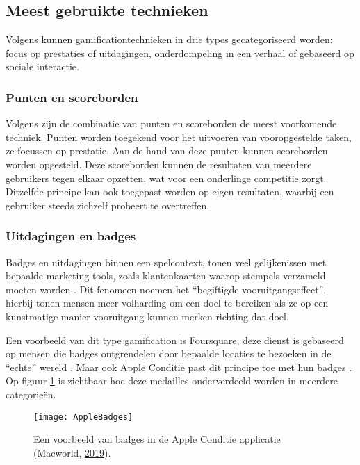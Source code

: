 \subsection{Meest gebruikte technieken}
Volgens \textcite{Legaki2020} kunnen gamificationtechnieken in drie types gecategoriseerd worden: focus op prestaties of uitdagingen, onderdompeling in een verhaal of gebaseerd op sociale interactie.

\subsubsection{Punten en scoreborden}
Volgens \textcite{Hamari2014} zijn de combinatie van punten en scoreborden de meest voorkomende techniek. Punten worden toegekend voor het uitvoeren van vooropgestelde taken, ze focussen op prestatie. Aan de hand van deze punten kunnen scoreborden worden opgesteld. Deze scoreborden kunnen de resultaten van meerdere gebruikers tegen elkaar opzetten, wat voor een onderlinge competitie zorgt. Ditzelfde principe kan ook toegepast worden op eigen resultaten, waarbij een gebruiker steeds zichzelf probeert te overtreffen.

\subsubsection{Uitdagingen en badges}
Badges en uitdagingen binnen een spelcontext, tonen veel gelijkenissen met bepaalde marketing tools, zoals klantenkaarten waarop stempels verzameld moeten worden \autocite{Nunes2006}. Dit fenomeen noemen \textcite{Nunes2006} het ``begiftigde vooruitgangseffect'', hierbij tonen mensen meer volharding om een doel te bereiken als ze op een kunstmatige manier vooruitgang kunnen merken richting dat doel.

Een voorbeeld van dit type gamification is \href{https://foursquare.com/}{Foursquare}, deze dienst is gebaseerd op mensen die badges ontgrendelen door bepaalde locaties te bezoeken in de ``echte'' wereld \autocite{Hamari2011}. Maar ook Apple Conditie past dit principe toe met hun badges \autocite{Ha2020}. Op figuur \ref{fig:apple_badges} is zichtbaar hoe deze medailles onderverdeeld worden in meerdere categorieën.

\begin{figure}[h]
    \caption[Badges in de Apple Conditie applicatie]{Een voorbeeld van badges in de Apple Conditie applicatie (Macworld, \href{https://www.macworld.com/article/231140/how-to-get-all-of-the-apple-watch-activity-challenge-badges.html}{2019}).}
    \texttt{[image: AppleBadges]}
    \label{fig:apple_badges}
\end{figure}

